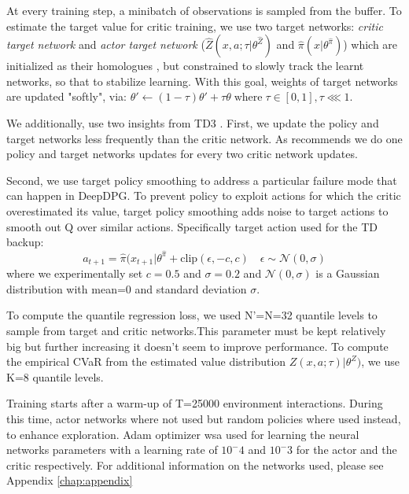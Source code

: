 At every training step, a minibatch of observations is sampled from the buffer.
To estimate the target value for critic training, we use two target networks:  \textit{critic target network} and \textit{actor target network}
($\hat{Z}(x,a;\tau | \theta^{\hat{Z}})$ and  $\hat{\pi}(x | \theta^{\hat{\pi}})$) which are initialized
as their homologues , but constrained to slowly track the learnt networks, so that to stabilize learning.
With this goal, weights of target networks are updated "softly", via:
$\theta' \leftarrow (1-\tau)\theta' + \tau\theta \; \text{where} \; \tau \in [0,1], \tau \lll 1$.

We additionally, use two insights from TD3 \citet{Fujimoto2018}.
First, we update the policy and target networks less frequently than the critic network. As 
\citet{Fujimoto2018} recommends we do one policy and target networks updates for every 
two critic network updates. 

Second, we use target policy smoothing to address a particular failure mode that can happen
in DeepDPG. To prevent policy to exploit 
actions for which the critic overestimated its value, target policy smoothing adds noise to target actions
to smooth out Q over similar actions. Specifically target action used for the TD backup:
\begin{equation}
    a_{t+1}=\hat{\pi}(x_{t+1} | \theta^{\hat{\pi}} + \text{clip}(\epsilon, -c, c) \quad \epsilon \sim \mathcal{N}(0,\sigma)
\end{equation}
where we experimentally set $c=0.5$ and $\sigma=0.2$ and $\mathcal{N}(0,\sigma)$ is a
Gaussian distribution with mean=0 and standard deviation $\sigma$.


To compute the quantile regression loss, we used N'=N=32 quantile levels to sample from
target and critic networks.This parameter must be kept relatively big but further increasing
it doesn't seem to improve performance.
To compute the empirical CVaR from the estimated value distribution 
$Z(x,a; \tau) | \theta^Z)$, we use K=8 quantile levels.


Training starts after a warm-up of T=25000 environment interactions. During this time, actor
networks where not used but random policies where used instead, to enhance exploration.
Adam optimizer wsa used for learning the neural networks parameters with a learning rate of $10^-4$ and $10^-3$
for the actor and the critic respectively.
For additional information on the networks used, please see Appendix \ref{chap:appendix}





